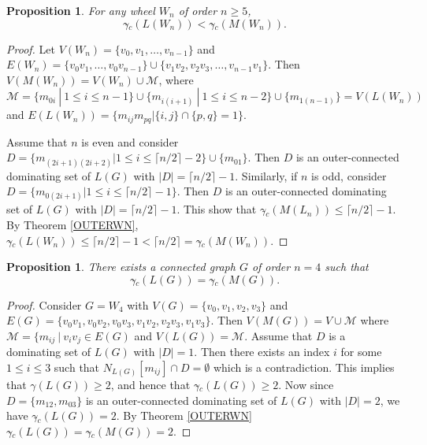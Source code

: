 \documentclass[a4paper,12pt, reqno]{amsart}
\newtheorem{Proposition}[Theorem]{Proposition}
\begin{document}
\begin{Proposition} \label{OUTERWNLWN} For any wheel $W_n$ of order $n\geq 5$, 
	$$\gamma{\tilde{}} _{c}(L(W_n)) < \gamma{\tilde{}} _{c}(M(W_n)).$$
\end{Proposition}
\begin{proof}
	Let $V(W_n)=\{v_0,v_1,\dots, v_{n-1}\}$ and $E(W_n)=\{v_0v_1,\dots, v_0v_{n-1}\}\cup\{v_1v_2, v_2v_3,\dots,v_{n-1}v_1\}$. Then $V(M(W_n))=V(W_n)\cup \mathcal{M}$, where $\mathcal{M}=\{ m_{0i}~|~1\leq i \leq n-1 \}\cup\{ m_{i(i+1)}~|~1\leq i \leq n-2 \}\cup\{m_{1(n-1)}\}=V(L(W_n))$ and $E(L(W_n))=\{m_{ij} m_{pq}| \{i,j\} \cap \{p,q\}=1\}$.

	
Assume that $n$ is even and consider $D=\{m_{(2i+1)(2i+2)}| 1 \leq i \leq \lceil n/2 \rceil-2 \} \cup \{m_{01}\}$. Then $D$ is an outer-connected dominating set of $L(G)$ with $|D|=\lceil n/2\rceil-1$. Similarly, if $n$ is odd, consider $D=\{m_{0(2i+1)}|1 \leq i \leq \lceil n/2 \rceil-1 \}$. Then $D$ is an outer-connected dominating set of $L(G)$ with $|D|=\lceil n/2\rceil-1$. This show that $\gamma{\tilde{}} _{c}(M(L_{n}))\leq \lceil n/2\rceil-1$.  By Theorem \ref{OUTERWN}, $\gamma{\tilde{}} _{c}(L(W_n)) \leq \lceil n/2 \rceil-1  < \lceil n/2 \rceil= \gamma{\tilde{}} _{c}(M(W_n)).$
\end{proof}
\begin{Proposition}\label{LW4=MW4}
There exists a connected graph $G$ of order $n=4$ such that
$$\gamma{\tilde{}} _{c}(L(G)) = \gamma{\tilde{}} _{c}(M(G)).$$
\end{Proposition}
\begin{proof}
Consider $G=W_4$ with $V(G)=\{v_0, v_1,v_2,v_3\}$ and $E(G)=\{v_0 v_1,v_0 v_2,v_0 v_3, v_1 v_2,v_2 v_3,v_1 v_3\}.$ Then $V(M(G))=V \cup \mathcal{M}$ where $\mathcal{M}=\{m_{ij}~|~ v_iv_j\in E(G)$ and $V(L(G))= \mathcal{M}$. Assume that $D$ is a dominating set of $L(G)$ with $|D|=1$. Then there exists an index $i$ for some $1\leq i \leq 3$ such that $N_{L(G)}[m_{ij}] \cap D=\emptyset$ which is a contradiction. This implies that $\gamma(L(G)) \geq 2$, and hence that $\gamma{\tilde{}} _{c}(L(G)) \geq 2$. Now since $D=\{m_{12}, m_{03}\}$  is an outer-connected dominating set of $L(G)$ with $|D|=2$, we have $\gamma{\tilde{}} _{c}(L(G))=2$. By Theorem \ref{OUTERWN}
$\gamma{\tilde{}} _{c}(L(G)) = \gamma{\tilde{}} _{c}(M(G))=2.$
\end{proof}
\end{document}
